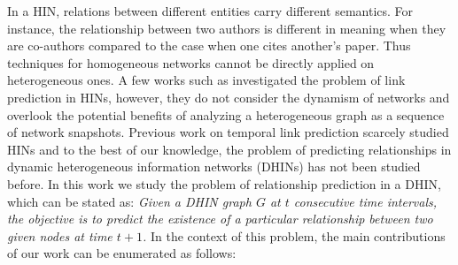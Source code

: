 In a HIN, relations between different entities carry different semantics. For instance, the relationship between two authors is different in meaning when they are co-authors compared to the case when one cites another's paper. Thus techniques for homogeneous networks \cite{liben2007link,wang2007local,lichtenwalter2010new,leroy2010cold,al2006link} cannot be directly applied on heterogeneous ones. A few works such as \cite{sun2011ASONAM,Sun:2012:HRP:2124295.2124373} investigated the problem of link prediction in HINs, however, they do not consider the dynamism of networks and overlook the potential benefits of analyzing a heterogeneous graph as a sequence of network snapshots. %
Previous work on temporal link prediction scarcely studied HINs and to the best of our knowledge, the problem of predicting relationships in dynamic heterogeneous information networks (DHINs) has not been studied before. %
In this work we study the problem of relationship prediction in a DHIN, which can be stated as: \textit{Given a DHIN graph $G$ at $t$ consecutive time intervals, the objective is to predict the existence of a particular relationship between two given nodes at time $t+1$.} 
In the context of this problem, the main contributions of our work can be enumerated as follows:








